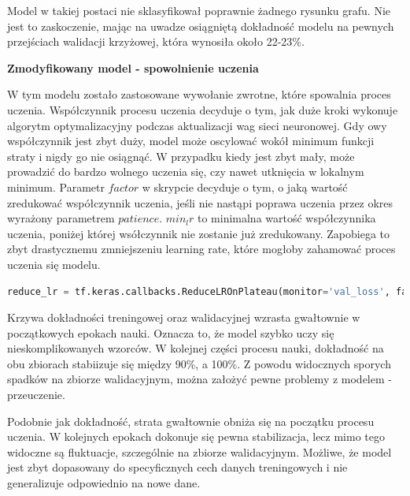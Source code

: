 Model w takiej postaci nie sklasyfikował poprawnie żadnego rysunku grafu.
Nie jest to zaskoczenie, mając na uwadze osiągniętą dokładność modelu na pewnych przejściach walidacji krzyżowej,
która wynosiła około 22-23\%.

\textbf{Zmodyfikowany model - spowolnienie uczenia}

W tym modelu zostało zastosowane wywołanie zwrotne, które spowalnia proces uczenia.
Współczynnik procesu uczenia decyduje o tym, jak duże kroki wykonuje algorytm optymalizacyjny podczas aktualizacji wag sieci neuronowej.
Gdy owy współczynnik jest zbyt duży, model może oscylować wokół minimum funkcji straty i nigdy go nie osiągnąć.
W przypadku kiedy jest zbyt mały, może prowadzić do bardzo wolnego uczenia się, czy nawet utknięcia w lokalnym minimum.
Parametr $factor$ w skrypcie decyduje o tym, o jaką wartość zredukować współczynnik uczenia,
jeśli nie nastąpi poprawa uczenia przez okres wyrażony parametrem $patience$.
$min_lr$ to minimalna wartość współczynnika uczenia, poniżej której wsółczynnik nie zostanie już zredukowany.
Zapobiega to zbyt drastycznemu zmniejszeniu learning rate, które mogłoby zahamować proces uczenia się modelu.

\begin{lstlisting}[language=Python,caption=Listing zmodyfikowanego skryptu
	znajdującego się bezpośrdenio po tworzeniu modelu z walidacją krzyżową - wersja 4,label={tests-model-crossval4}]
	reduce_lr = tf.keras.callbacks.ReduceLROnPlateau(monitor='val_loss', factor=0.2, patience=5, min_lr=0.001)
\end{lstlisting}

Krzywa dokładności treningowej oraz walidacyjnej wzrasta gwałtownie w początkowych epokach nauki.
Oznacza to, że model szybko uczy się nieskomplikowanych wzorców.
W kolejnej części procesu nauki, dokładność na obu zbiorach stabiizuje się między 90\%, a 100\%.
Z powodu widocznych sporych spadków na zbiorze walidacyjnym, można założyć pewne problemy z modelem - przeuczenie.

Podobnie jak dokładność, strata gwałtownie obniża się na początku procesu uczenia.
W kolejnych epokach dokonuje się pewna stabilizacja, lecz mimo tego widoczne są fluktuacje, szczególnie na zbiorze walidacyjnym.
Możliwe, że model jest zbyt dopasowany do specyficznych cech danych treningowych i nie generalizuje odpowiednio na nowe dane.

